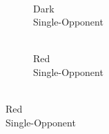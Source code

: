 \documentclass[journal,onecolumn]{IEEEtran}
\begin{document}
\begin{figure}[h]
\begin{subfigure}{0.15\textwidth}
    \end{subfigure}
    \begin{subfigure}{0.15\textwidth}
        \centering
        \captionsetup{justification=centering}
        \caption{\\ Dark\\ Single-Opponent}
    \end{subfigure}
    \begin{subfigure}{0.15\textwidth}
        \centering
        \captionsetup{justification=centering}
        \caption{\\ Red\\ Single-Opponent}

\end{subfigure}
\end{figure}
\end{document}
